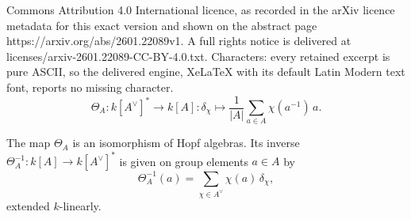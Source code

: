 \documentclass[10pt,a4paper]{amsart}
\begin{document}
Commons Attribution 4.0 International licence, as recorded in the arXiv licence metadata for this exact version and shown on the abstract page https://arxiv.org/abs/2601.22089v1. A full rights notice is delivered at licenses/arxiv-2601.22089-CC-BY-4.0.txt. Characters: every retained excerpt is pure ASCII, so the delivered engine, XeLaTeX with its default Latin Modern text font, reports no missing character.
\begin{equation}\label{eq:ThetaDef}
\Theta_A:k[A^\vee]^*\longrightarrow k[A]: \delta_\chi \mapsto \frac{1}{|A|}\sum_{a\in A}\chi(a^{-1})\,a.
\end{equation}

\begin{proposition}\label{prop:ThetaInv}
The map $\Theta_A$ is an isomorphism of Hopf algebras. Its inverse $\Theta_A^{-1}:k[A]\to k[A^\vee]^*$ is given on group elements $a \in A$ by
\begin{equation}\label{eq:ThetaInv}
\Theta_A^{-1}(a)=\sum_{\chi\in A^\vee}\chi(a)\,\delta_\chi,
\end{equation}
extended $k$-linearly.
\end{proposition}
\end{document}

